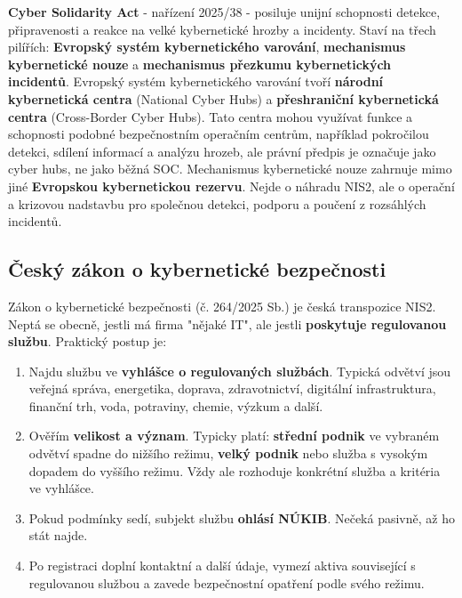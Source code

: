 \textbf{Cyber Solidarity Act} - nařízení 2025/38 - posiluje unijní schopnosti detekce, připravenosti a reakce na velké kybernetické hrozby a incidenty. Staví na třech pilířích: \textbf{Evropský systém kybernetického varování}, \textbf{mechanismus kybernetické nouze} a \textbf{mechanismus přezkumu kybernetických incidentů}. Evropský systém kybernetického varování tvoří \textbf{národní kybernetická centra} (National Cyber Hubs) a \textbf{přeshraniční kybernetická centra} (Cross-Border Cyber Hubs). Tato centra mohou využívat funkce a schopnosti podobné bezpečnostním operačním centrům, například pokročilou detekci, sdílení informací a analýzu hrozeb, ale právní předpis je označuje jako cyber hubs, ne jako běžná SOC. Mechanismus kybernetické nouze zahrnuje mimo jiné \textbf{Evropskou kybernetickou rezervu}. Nejde o náhradu NIS2, ale o operační a krizovou nadstavbu pro společnou detekci, podporu a poučení z rozsáhlých incidentů.

\subsection*{Český zákon o kybernetické bezpečnosti}
Zákon o kybernetické bezpečnosti (č. 264/2025 Sb.) je česká transpozice NIS2. Neptá se obecně, jestli má firma "nějaké IT", ale jestli \textbf{poskytuje regulovanou službu}. Praktický postup je:
\begin{enumerate}
  \item Najdu službu ve \textbf{vyhlášce o regulovaných službách}. Typická odvětví jsou veřejná správa, energetika, doprava, zdravotnictví, digitální infrastruktura, finanční trh, voda, potraviny, chemie, výzkum a další.
  \item Ověřím \textbf{velikost a význam}. Typicky platí: \textbf{střední podnik} ve vybraném odvětví spadne do nižšího režimu, \textbf{velký podnik} nebo služba s vysokým dopadem do vyššího režimu. Vždy ale rozhoduje konkrétní služba a kritéria ve vyhlášce.
  \item Pokud podmínky sedí, subjekt službu \textbf{ohlásí NÚKIB}. Nečeká pasivně, až ho stát najde.
  \item Po registraci doplní kontaktní a další údaje, vymezí aktiva související s regulovanou službou a zavede bezpečnostní opatření podle svého režimu.
\end{enumerate}


